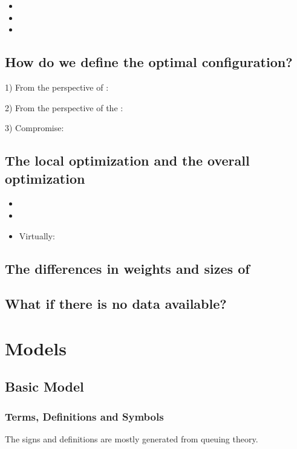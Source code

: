 \documentclass{apmcmthesis}
\begin{document}
\begin{itemize}
  \item
  \item
  \item
\end{itemize}


\subsection{How do we define the optimal configuration?}
1) From the perspective of      :\par
2) From the perspective of the      :\par
3) Compromise:

\subsection{The local optimization and the overall optimization}


\begin{itemize}
  \item
  \item
  \item Virtually:
\end{itemize}


\subsection{The differences in weights and sizes of}


\subsection{What if there is no data available?}






\section{Models}
\subsection{Basic Model}


\subsubsection{Terms, Definitions and Symbols}
The signs and definitions are mostly generated from queuing theory.
\end{document}
